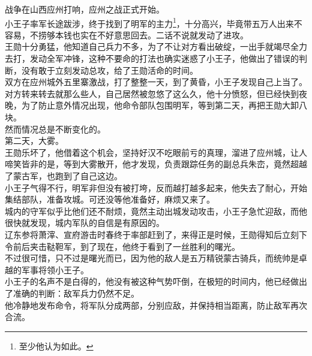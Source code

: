 \begin{multicols}{\theparacolNo}
战争在山西应州打响，应州之战正式开始。\\

小王子率军长途跋涉，终于找到了明军的主力\footnote{至少他认为如此。}，十分高兴，毕竟带五万人出来不容易，不捞够本钱也实在不好意思回去。二话不说就发动了进攻。\\

王勋十分勇猛，他知道自己兵力不多，为了不让对方看出破绽，一出手就竭尽全力去打，发动全军冲锋，这种不要命的打法也确实迷惑了小王子，他做出了错误的判断，没有敢于立刻发动总攻，给了王勋活命的时间。\\

双方在应州城外五里寨激战，打了整整一天，到了黄昏，小王子发现自己上当了。\\

对方转来转去就那么些人，自己居然被忽悠了这么久，他十分愤怒，但已经快到夜晚，为了防止意外情况出现，他命令部队包围明军，等到第二天，再把王勋大卸八块。\\

然而情况总是不断变化的。\\

第二天，大雾。\\

王勋乐坏了，他借着这个机会，坚持好汉不吃眼前亏的真理，溜进了应州城，让人啼笑皆非的是，等到大雾散开，他才发现，负责跟踪任务的副总兵朱峦，竟然超越了蒙古军，也跑到了自己这边。\\

小王子气得不行，明军非但没有被打垮，反而越打越多起来，他失去了耐心，开始集结部队，准备攻城。可还没等他准备好，麻烦又来了。\\

城内的守军似乎比他们还不耐烦，竟然主动出城发动攻击，小王子急忙迎敌，而他很快就发现，城内军队的自信是有原因的。\\

辽东参将萧滓、宣府游击时春终于率部赶到了，来得正是时候，王勋得知后立刻下令前后夹击鞑靼军，到了现在，他终于看到了一丝胜利的曙光。\\

不过很可惜，只不过是曙光而已，因为他的敌人是五万精锐蒙古骑兵，而统帅是卓越的军事将领小王子。\\

小王子的名声不是白得的，他没有被这种气势吓倒，在极短的时间内，他已经做出了准确的判断：敌军兵力仍然不足。\\

他冷静地发布命令，将军队分成两部，分别应敌，并保持相当距离，防止敌军再次合流。\\


\end{multicols}

